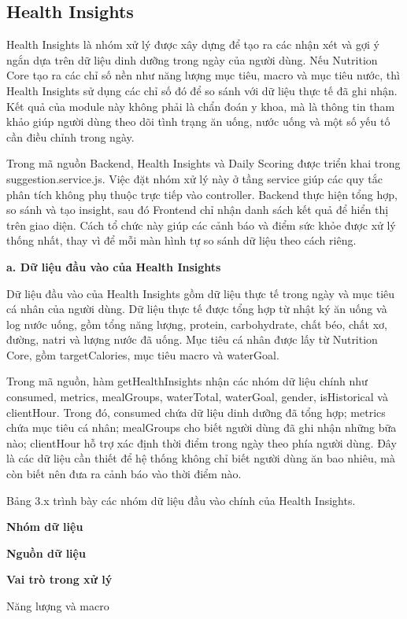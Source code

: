 \documentclass[12pt, a4paper]{report}
\begin{document}
\subsection{Health Insights}Health Insights là nhóm xử lý được xây dựng để tạo ra các nhận xét và gợi ý ngắn dựa trên dữ liệu dinh dưỡng trong ngày của người dùng. Nếu Nutrition Core tạo ra các chỉ số nền như năng lượng mục tiêu, macro và mục tiêu nước, thì Health Insights sử dụng các chỉ số đó để so sánh với dữ liệu thực tế đã ghi nhận. Kết quả của module này không phải là chẩn đoán y khoa, mà là thông tin tham khảo giúp người dùng theo dõi tình trạng ăn uống, nước uống và một số yếu tố cần điều chỉnh trong ngày.

Trong mã nguồn Backend, Health Insights và Daily Scoring được triển khai trong suggestion.service.js. Việc đặt nhóm xử lý này ở tầng service giúp các quy tắc phân tích không phụ thuộc trực tiếp vào controller. Backend thực hiện tổng hợp, so sánh và tạo insight, sau đó Frontend chỉ nhận danh sách kết quả để hiển thị trên giao diện. Cách tổ chức này giúp các cảnh báo và điểm sức khỏe được xử lý thống nhất, thay vì để mỗi màn hình tự so sánh dữ liệu theo cách riêng.

\textbf{a. Dữ liệu đầu vào của Health Insights}

Dữ liệu đầu vào của Health Insights gồm dữ liệu thực tế trong ngày và mục tiêu cá nhân của người dùng. Dữ liệu thực tế được tổng hợp từ nhật ký ăn uống và log nước uống, gồm tổng năng lượng, protein, carbohydrate, chất béo, chất xơ, đường, natri và lượng nước đã uống. Mục tiêu cá nhân được lấy từ Nutrition Core, gồm targetCalories, mục tiêu macro và waterGoal.

Trong mã nguồn, hàm getHealthInsights nhận các nhóm dữ liệu chính như consumed, metrics, mealGroups, waterTotal, waterGoal, gender, isHistorical và clientHour. Trong đó, consumed chứa dữ liệu dinh dưỡng đã tổng hợp; metrics chứa mục tiêu cá nhân; mealGroups cho biết người dùng đã ghi nhận những bữa nào; clientHour hỗ trợ xác định thời điểm trong ngày theo phía người dùng. Đây là các dữ liệu cần thiết để hệ thống không chỉ biết người dùng ăn bao nhiêu, mà còn biết nên đưa ra cảnh báo vào thời điểm nào.

Bảng 3.x trình bày các nhóm dữ liệu đầu vào chính của Health Insights.

\textbf{Nhóm dữ liệu}

\textbf{Nguồn dữ liệu}

\textbf{Vai trò trong xử lý}

Năng lượng và macro
\end{document}
